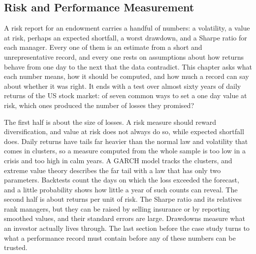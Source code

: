 
\raggedbottom %
\begin{chapterrefs}
\setcounter{chapter}{7}
\chapter{Risk and Performance Measurement}
\label{ch:risk}

A risk report for an endowment carries a handful of numbers: a volatility, a value at risk, perhaps
an expected shortfall, a worst drawdown, and a Sharpe ratio for each manager. Every one of them is an
estimate from a short and unrepresentative record, and every one rests on assumptions about how
returns behave from one day to the next that the data contradict. This chapter asks what each number
means, how it should be computed, and how much a record can say about whether it was right. It ends
with a test over almost sixty years of daily returns of the US stock market: of seven common ways to
set a one day value at risk, which ones produced the number of losses they promised?

The first half is about the size of losses. A risk measure should reward diversification, and value
at risk does not always do so, while expected shortfall does. Daily returns have tails far heavier
than the normal law and volatility that comes in clusters, so a measure computed from the whole
sample is too low in a crisis and too high in calm years. A GARCH model tracks the clusters, and
extreme value theory describes the far tail with a law that has only two parameters. Backtests count
the days on which the loss exceeded the forecast, and a little probability shows how little a year of
such counts can reveal. The second half is about returns per unit of risk. The Sharpe ratio and its
relatives rank managers, but they can be raised by selling insurance or by reporting smoothed values,
and their standard errors are large. Drawdowns measure what an investor actually lives through.
The last section before the case study turns to what a performance record must contain before any of
these numbers can be trusted.


\end{chapterrefs}
